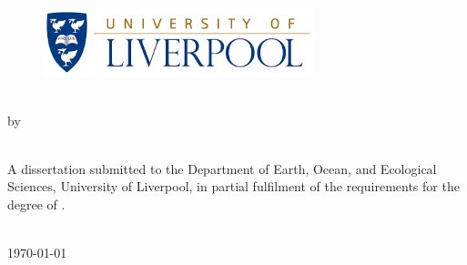 

\thispagestyle{empty}

\begin{figure}[t!]
  \begin{center}
    \includegraphics[width=0.7\textwidth]{figures/university-of-liverpool-logo}
  \end{center}
\end{figure}

\vspace*{3cm}

\begin{center}
  \textbf{\LARGE \Title{}}
  \\[10mm]
  {\Large by}
  \\[10mm]
  {\Large \Name}
  \\
  \vfill
  \begin{minipage}[t]{0.7\textwidth}
    A dissertation submitted to the
    Department of Earth, Ocean, and
    Ecological Sciences,
    University of Liverpool, in partial fulfilment of
    the requirements for the degree of
    \Degree{}.
  \end{minipage}
  \\[3cm]
  \monthyear\today
\end{center}
